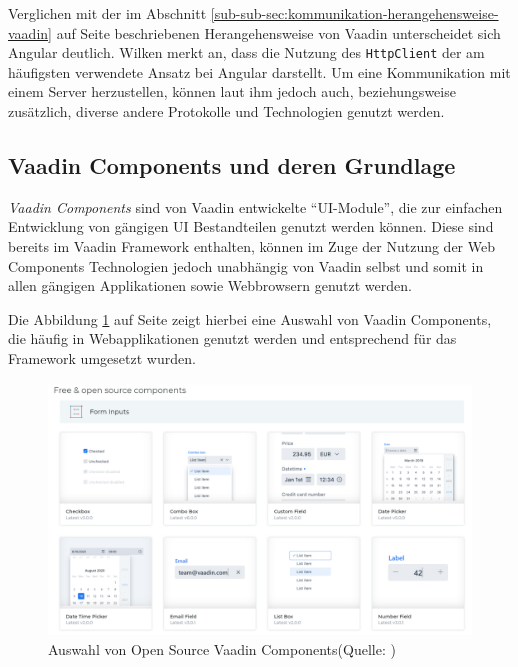 \documentclass[a4paper,12pt,twoside]{scrreprt}
\begin{document}
Verglichen mit der im Abschnitt \ref{sub-sub-sec:kommunikation-herangehensweise-vaadin} auf Seite \pageref{sub-sub-sec:kommunikation-herangehensweise-vaadin} beschriebenen Herangehensweise von Vaadin unterscheidet sich Angular deutlich. Wilken merkt an, dass die Nutzung des \texttt{HttpClient} der am häufigsten verwendete Ansatz bei Angular darstellt. Um eine Kommunikation mit einem Server herzustellen, können laut ihm jedoch auch, beziehungsweise zusätzlich, diverse andere Protokolle und Technologien genutzt werden. \parencite[][]{wilken_angular_2018}

\subsection{Vaadin Components und deren Grundlage}
\label{sub-sec:vaadin-components}
\textit{Vaadin Components} sind von Vaadin entwickelte \enquote{\acs{UI}-Module}, die zur einfachen Entwicklung von gängigen \acl{UI} Bestandteilen genutzt werden können. Diese sind bereits im Vaadin Framework enthalten, können im Zuge der Nutzung der Web Components Technologien jedoch unabhängig von Vaadin selbst und somit in allen gängigen Applikationen sowie Webbrowsern genutzt werden. \parencite[][Seite 2ff.]{vaadin_ltd_vaadin_nodate-2}

Die Abbildung \ref{fig:vaadin-components-overview} auf Seite \pageref{fig:vaadin-components-overview} zeigt hierbei eine Auswahl von Vaadin Components, die häufig in Webapplikationen genutzt werden und entsprechend für das Framework umgesetzt wurden.

\begin{figure}[ht]
    \centering
    \includegraphics[scale=0.38]{images/Vaadin_Components-overview.png}
    \caption[Auswahl von Open Source Vaadin Components]{Auswahl von Open Source Vaadin Components\newline(Quelle: \cite[][]{vaadin_ltd_mobile_nodate})}
    \label{fig:vaadin-components-overview}
\end{figure}
\end{document}
